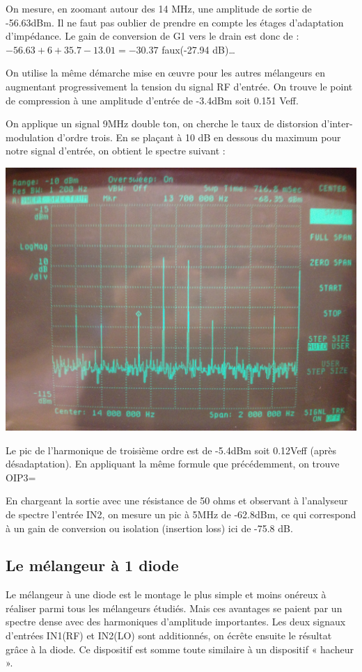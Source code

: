 \documentclass{article}
\begin{document}
On mesure, en zoomant autour des 14 MHz, une amplitude de sortie de -56.63dBm.
Il ne faut pas oublier de prendre en compte les étages d'adaptation d'impédance. Le gain de conversion de G1 vers le drain est donc de : $-56.63+6+35.7-13.01=-30.37$ faux(-27.94 dB)…


On utilise la même démarche mise en œuvre pour les autres mélangeurs en augmentant progressivement la tension du signal RF d'entrée.
On trouve le point de compression à une amplitude d'entrée de -3.4dBm soit 0.151 Veff.


On applique un signal 9MHz double ton, on cherche le taux de distorsion d'inter-modulation d'ordre trois.
En se plaçant à 10 dB en dessous du maximum pour notre signal d'entrée, on obtient le spectre suivant :
\begin{center}
\includegraphics[width=0.7\linewidth]{10_3_4.jpg}
\end{center}
Le pic de l'harmonique de troisième ordre est de -5.4dBm soit 0.12Veff (après désadaptation).
En appliquant la même formule que précédemment, on trouve OIP3=


En chargeant la sortie avec une résistance de 50 ohms et observant à l'analyseur de spectre l'entrée IN2, on mesure un pic à 5MHz de -62.8dBm, ce qui correspond à un gain de conversion ou isolation  (insertion loss) ici de -75.8 dB.


\subsection{Le mélangeur à 1 diode}
Le mélangeur à une diode est le montage le plus simple  et moins onéreux à réaliser parmi tous les mélangeurs étudiés. Mais ces avantages se paient par un spectre dense avec des harmoniques d'amplitude importantes.
Les deux signaux d'entrées IN1(RF) et IN2(LO) sont additionnés, on écrête ensuite le résultat grâce à la diode.
Ce dispositif est somme toute similaire à un dispositif « hacheur ».
\end{document}
